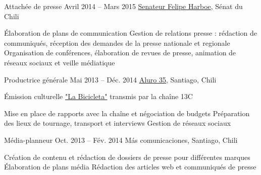 \begin{joblist}
{{\begin{itemize}
		\end{itemize}      
        }
	}



\item[Attachée de presse]{Avril 2014 -- Mars 2015}
     {
     \href{https://www.harboe.cl/}{Senateur Felipe Harboe}, Sénat du Chili
     } 
	 {
        \normalsize{
		\iftbftiny \vspace{-0.5cm} \fi
			\begin{itemize}
			  \iftbftiny \setlength\itemsep{-3pt} \fi
			  \cvitem[\checkmark] Élaboration de plans de communication
			  \cvitem[\checkmark] Gestion de relations presse : rédaction de communiqués, réception des demandes de la presse nationale et regionale
			  \cvitem[\checkmark] Organisation de conférences, élaboration de revues de presse, animation de réseaux sociaux et veille médiatique
			\end{itemize}     
		}	
	}
    
    
    
\item[Productrice générale]{Mai 2013 -- Déc. 2014}
     {
     \href{https://www.aluro35.com/}{Aluro 35}, Santiago, Chili
     }
     {Émission culturelle \href{http://www.13.cl/c/programas/la-bicicleta}{"La Bicicleta"} transmis par la chaîne 13C \\

        \normalsize{
		\iftbftiny \vspace{-0.5cm} \fi
			\begin{itemize}
			  \iftbftiny \setlength\itemsep{-3pt} \fi
			  \cvitem[\checkmark] Mise en place de rapports avec la chaîne et négociation de budgets                       
			  \cvitem[\checkmark] Préparation des lieux de tournage, transport et interviews
			  \cvitem[\checkmark] Gestion de réseaux sociaux
			\end{itemize}     
		}	
	}



\item[Média-planneur]{Oct. 2013 -- Fév. 2014 }     
  	{
  	Más comunicaciones, Santiago, Chili
  	}     
  	{
        \normalsize{
		\iftbftiny \vspace{-0.5cm} \fi
		\begin{itemize}
			  \iftbftiny \setlength\itemsep{-3pt} \fi
			  \cvitem[\checkmark]  Création de contenu et rédaction de dossiers de presse pour différentes marques                                
			  \cvitem[\checkmark]  Élaboration de plans média                                    
			  \cvitem[\checkmark]  Rédaction des articles web et communiqués de presse
			  

\end{itemize}}}
\end{joblist}
